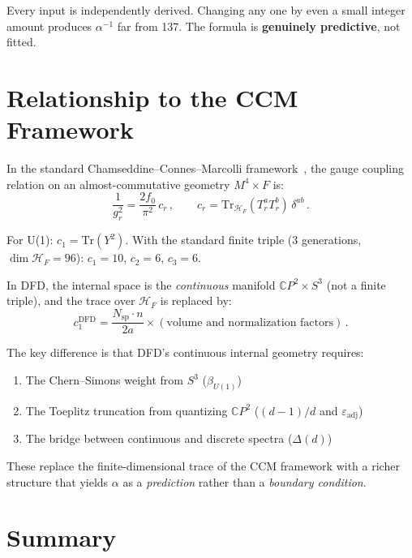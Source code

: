 \documentclass[12pt,a4paper]{article}
\theoremstyle{definition}
\begin{document}
Every input is independently derived.  Changing any one by even a small
integer amount produces $\alpha^{-1}$ far from 137.  The formula is
\textbf{genuinely predictive}, not fitted.

\section{Relationship to the CCM Framework}
\label{sec:ccm}

In the standard Chamseddine--Connes--Marcolli
framework~\cite{CCM2007,CC1996}, the gauge
coupling relation on an almost-commutative geometry
$M^4 \times F$ is:
\begin{equation}
\frac{1}{g_r^2} = \frac{2f_0}{\pi^2}\,c_r\,,
\qquad c_r = \mathrm{Tr}_{\mathcal{H}_F}(T_r^a T_r^b)\,\delta^{ab}\,.
\end{equation}

For U(1): $c_1 = \mathrm{Tr}(Y^2)$.  With the standard finite triple
(3 generations, $\dim\mathcal{H}_F = 96$):
$c_1 = 10$, $c_2 = 6$, $c_3 = 6$.

In DFD, the internal space is the \emph{continuous} manifold
$\mathbb{C}P^2 \times S^3$ (not a finite triple), and the trace over
$\mathcal{H}_F$ is replaced by:
\begin{equation}
c_1^{\mathrm{DFD}} = \frac{N_{\mathrm{sp}} \cdot n}{2a}
\times (\text{volume and normalization factors})\,.
\end{equation}

The key difference is that DFD's continuous internal geometry requires:
\begin{enumerate}
\item The Chern--Simons weight from $S^3$ ($\beta_{U(1)}$)
\item The Toeplitz truncation from quantizing $\mathbb{C}P^2$
  ($(d{-}1)/d$ and $\varepsilon_{\mathrm{adj}}$)
\item The bridge between continuous and discrete spectra ($\Delta(d)$)
\end{enumerate}

These replace the finite-dimensional trace of the CCM framework with a
richer structure that yields $\alpha$ as a \emph{prediction} rather than
a \emph{boundary condition}.

\section{Summary}
\label{sec:summary}
\end{document}
